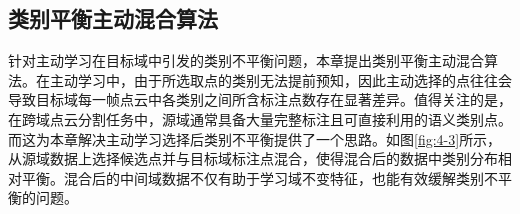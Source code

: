     \subsection{类别平衡主动混合算法}  %
    针对主动学习在目标域中引发的类别不平衡问题，本章提出类别平衡主动混合算法。在主动学习中，由于所选取点的类别无法提前预知，因此主动选择的点往往会导致目标域每一帧点云中各类别之间所含标注点数存在显著差异。值得关注的是，在跨域点云分割任务中，源域通常具备大量完整标注且可直接利用的语义类别点。而这为本章解决主动学习选择后类别不平衡提供了一个思路。如图\ref{fig:4-3}所示，从源域数据上选择候选点并与目标域标注点混合，使得混合后的数据中类别分布相对平衡。混合后的中间域数据不仅有助于学习域不变特征，也能有效缓解类别不平衡的问题。%

